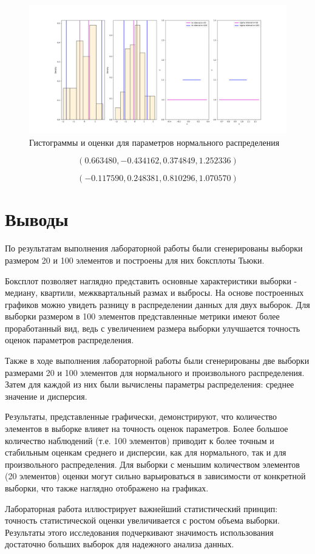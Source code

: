 \documentclass[12pt,a4paper]{article}
\begin{document}
	\begin{figure}[htbp!]
		\begin{center}
			\includegraphics[width = 1.12\linewidth]{graphics/lab2_hists.png}
			\caption{Гистограммы и оценки для параметров нормального распределения}
		\end{center}
	\end{figure}

	\vspace{12em}

	\[
		(0.663480, -0.434162, 0.374849, 1.252336)
	\]

	\[
		(-0.117590, 0.248381, 0.810296, 1.070570)
	\]

	\vspace{10em}

	\section{Выводы}

	По результатам выполнения лабораторной работы были сгенерированы выборки размером 20 и 100 элементов и построены для них боксплоты Тьюки.

	Боксплот позволяет наглядно представить основные характеристики выборки - медиану, квартили, межквартальный размах и выбросы. На основе построенных графиков можно увидеть разницу в распределении данных для двух выборок. Для выборки размером в 100 элементов представленные метрики имеют более проработанный вид, ведь с увеличением размера выборки улучшается точность оценок параметров распределения.

	Также в ходе выполнения лабораторной работы были сгенерированы две выборки размерами 20 и 100 элементов для нормального и произвольного распределения. Затем для каждой из них были вычислены параметры распределения: среднее значение и дисперсия.

	Результаты, представленные графически, демонстрируют, что количество элементов в выборке влияет на точность оценок параметров. Более большое количество наблюдений (т.е. 100 элементов) приводит к более точным и стабильным оценкам среднего и дисперсии, как для нормального, так и для произвольного распределения. Для выборки с меньшим количеством элементов (20 элементов) оценки могут сильно варьироваться в зависимости от конкретной выборки, что также наглядно отображено на графиках.

	Лабораторная работа иллюстрирует важнейший статистический принцип: точность статистической оценки увеличивается с ростом объема выборки. Результаты этого исследования подчеркивают значимость использования достаточно больших выборок для надежного анализа данных.
\end{document}

